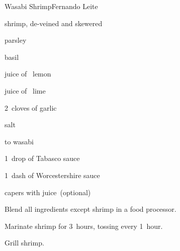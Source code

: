 \begin{recipe}{Wasabi Shrimp}{Fernando Leite}{}

\begin{ingredients}
\item shrimp, de-veined and skewered
\item parsley
\item basil
\item juice of \quarter~lemon
\item juice of \quarter~lime
\item 2~cloves of garlic
\item salt
\item \half to  wasabi
\item 1~drop of Tabasco sauce
\item 1~dash of Worcestershire sauce
\item capers with juice~(optional)
\end{ingredients}

\begin{directions}
\item Blend all ingredients except shrimp in a food processor.
\item Marinate shrimp for 3~hours, tossing every 1~hour.
\item Grill shrimp.
\end{directions}

\end{recipe}
